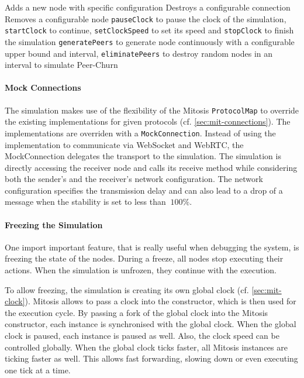 \begin{itemize}
     Adds a new node with specific configuration
      Destroys a configurable connection
     Removes a configurable node
     \lstinline|pauseClock| to pause the clock of the simulation, \lstinline|startClock| to continue, \lstinline|setClockSpeed| to set its speed and \lstinline|stopClock| to finish the simulation
     \lstinline|generatePeers| to generate node continuously with a configurable upper bound and interval, \lstinline|eliminatePeers| to destroy random nodes in an interval to simulate Peer-Churn
\end{itemize}

\paragraph{Mock Connections}
The simulation makes use of the flexibility of the Mitosis \lstinline|ProtocolMap| to override the existing implementations for given protocols (cf. \vref{sec:mit-connections}). The implementations are overriden with a  \lstinline|MockConnection|. Instead of using the implementation to communicate via WebSocket and WebRTC, the MockConnection delegates the transport to the simulation. The simulation is directly accessing the receiver node and calls its receive method while considering both the sender's and the receiver's network configuration. The network configuration specifies the transmission delay and can also lead to a drop of a message when the stability is set to less than $\ 100\% $.

\paragraph{Freezing the Simulation}
One import important feature, that is really useful when debugging the system, is freezing the state of the nodes. During a freeze, all nodes stop executing their actions. When the simulation is unfrozen, they continue with the execution.

To allow freezing, the simulation is creating its own global clock (cf. \vref{sec:mit-clock}). Mitosis allows to pass a clock into the constructor, which is then used for the execution cycle. By passing a fork of the global clock into the Mitosis constructor, each instance is synchronised with the global clock. When the global clock is paused, each instance is paused as well.
Also, the clock speed can be controlled globally. When the global clock ticks faster, all Mitosis instances are ticking faster as well. This allows fast forwarding, slowing down or even executing one tick at a time.

